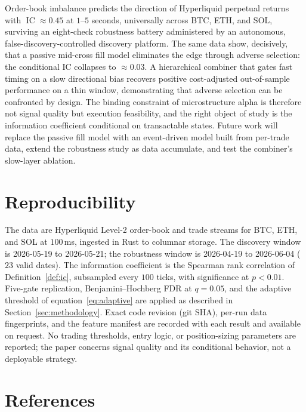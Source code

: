 \documentclass[11pt,a4paper]{article}
\theoremstyle{definition}
\theoremstyle{plain}
\DeclareMathOperator{\IC}{IC}
\begin{document}
Order-book imbalance predicts the direction of Hyperliquid perpetual returns with
$\IC\approx 0.45$ at $1$--$5$ seconds, universally across BTC, ETH, and SOL, surviving an
eight-check robustness battery administered by an autonomous, false-discovery-controlled discovery
platform. The same data show, decisively, that a passive mid-cross fill model eliminates the edge
through adverse selection: the conditional IC collapses to $\approx 0.03$. A hierarchical combiner
that gates fast timing on a slow directional bias recovers positive cost-adjusted out-of-sample
performance on a thin window, demonstrating that adverse selection can be confronted by design. The
binding constraint of microstructure alpha is therefore not signal quality but execution
feasibility, and the right object of study is the information coefficient conditional on
transactable states. Future work will replace the passive fill model with an event-driven model
built from per-trade data, extend the robustness study as data accumulate, and test the combiner's
slow-layer ablation.

\section*{Reproducibility}

The data are Hyperliquid Level-2 order-book and trade streams for BTC, ETH, and SOL at $100$\,ms,
ingested in Rust to columnar storage. The discovery window is 2026-05-19 to 2026-05-21; the
robustness window is 2026-04-19 to 2026-06-04 ($23$ valid dates). The information coefficient is
the Spearman rank correlation of Definition~\ref{def:ic}, subsampled every $100$ ticks, with
significance at $p<0.01$. Five-gate replication, Benjamini--Hochberg FDR at $q=0.05$, and the
adaptive threshold of equation~\eqref{eq:adaptive} are applied as described in
Section~\ref{sec:methodology}. Exact code revision (git SHA), per-run data fingerprints, and the
feature manifest are recorded with each result and available on request. No trading thresholds,
entry logic, or position-sizing parameters are reported; the paper concerns signal quality and its
conditional behavior, not a deployable strategy.

\section*{References}
\end{document}
